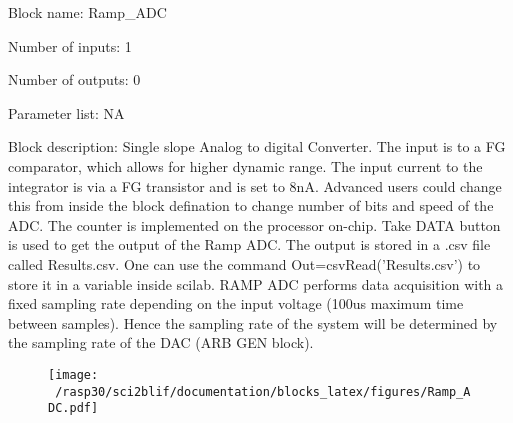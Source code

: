 \pagebreak

Block name: Ramp\_ADC

Number of inputs: 1

Number of outputs: 0

Parameter list: NA

Block description: 
Single slope Analog to digital Converter. The input is to a FG comparator, which allows for higher dynamic range. The input current to the integrator is via a FG transistor and is set to 8nA.
Advanced users could change this from inside the block defination to change number of bits and speed of the ADC. The counter is implemented on the processor on-chip. Take DATA button is used to get the output of the Ramp ADC.
The output is stored in a .csv file called Results.csv. One can use the command Out=csvRead('Results.csv') to store it in a variable inside scilab. RAMP ADC performs data acquisition with a fixed sampling rate depending on the input voltage (100us maximum time between samples).
Hence the sampling rate of the system will be determined by the sampling rate of the DAC (ARB GEN block). 

\begin{figure}[H]  %
\texttt{[image: ~/rasp30/sci2blif/documentation/blocks\_latex/figures/Ramp\_ADC.pdf]}
\end{figure}

